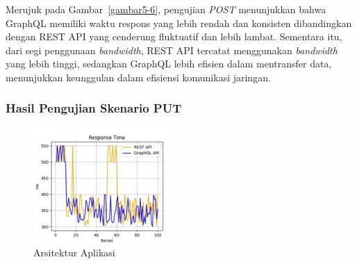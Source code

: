 \documentclass[
 manuscript=article,  %
  layout=publish, 
  year=2024, 
  month= Februari, %
  volume=8,
  number=1 
]{JIKO}
\begin{document}
Merujuk pada Gambar~\ref{gambar5-6}, pengujian \textit{POST} menunjukkan bahwa GraphQL memiliki waktu respons yang lebih rendah dan konsisten dibandingkan dengan REST API yang cenderung fluktuatif dan lebih lambat. Sementara itu, dari segi penggunaan \textit{bandwidth}, REST API tercatat menggunakan \textit{bandwidth} yang lebih tinggi, sedangkan GraphQL lebih efisien dalam mentransfer data, menunjukkan keunggulan dalam efisiensi komunikasi jaringan.

\subsubsection{Hasil Pengujian Skenario PUT}

\noindent
\begin{minipage}{0.48\textwidth}
    \begin{figure}[H]
        \centering
        \includegraphics[width=\textwidth]{assets/Picture7.jpg}
        \caption{Arsitektur Aplikasi}
        \label{fig:arsitektur}
    \end{figure}
\end{minipage}%
\hspace{0.04\textwidth}
\end{document}
